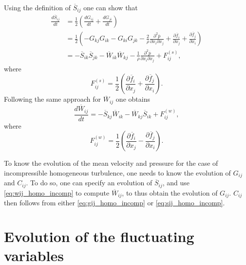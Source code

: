 \documentclass[oneside,a4paper,11pt]{report}
\newcommand{\favg}{\overline{f}}
\newcommand{\pavg}{\overline{p}}
\newcommand{\Savg}{\overline{S}}
\newcommand{\Wavg}{\overline{W}}
\begin{document}
Using the definition of $\Savg_{ij}$ one can show that
\begin{align}
\label{eq:sij_homo_incomp}
\frac{d \Savg_{ij}}{dt} &= \frac{1}{2} \left ( \frac{d G_{ij}}{dt} + \frac{d G_{ji}}{dt} \right ) \nonumber \\
& = \frac{1}{2} \left ( -G_{kj}G_{ik} - G_{ki}G_{jk} - \frac{2}{\rho} \frac{\partial^2 \pavg}{\partial x_i \partial x_j}  + \frac{\partial \favg_i }{\partial x_j} + \frac{ \partial \favg_j }{\partial x_i} \right ) \nonumber \\
& = -\Savg_{ik} \Savg_{jk} - \Wavg_{ik} \Wavg_{kj} - \frac{1}{\rho} \frac{\partial^2 \pavg}{\partial x_i \partial x_j} + F^{(s)}_{ij},
\end{align}
where
\begin{equation}
F^{(s)}_{ij} = \frac{1}{2} \left ( \frac{\partial \favg_i }{\partial x_j} + \frac{ \partial \favg_j }{\partial x_i} \right ).
\end{equation}
Following the same approach for $\Wavg_{ij}$ one obtains
\begin{equation}
\label{eq:wij_homo_incomp}
\frac{d \Wavg_{ij}}{dt} = -\Savg_{kj} \Wavg_{ik} - \Wavg_{kj} \Savg_{ik} + F^{(w)}_{ij},
\end{equation}
where
\begin{equation}
F^{(w)}_{ij} = \frac{1}{2} \left ( \frac{\partial \favg_i }{\partial x_j} - \frac{ \partial \favg_j }{\partial x_i} \right ).
\end{equation}

To know the evolution of the mean velocity and pressure for the case of incompressible homogeneous turbulence, one needs to know the evolution of $G_{ij}$ and $C_{ij}$. To do so, one can specify an evolution of $\Savg_{ij}$, and use \cref{eq:wij_homo_incomp} to compute $\Wavg_{ij}$, to thus obtain the evolution of $G_{ij}$. $C_{ij}$ then follows from either \cref{eq:gij_homo_incomp} or \cref{eq:sij_homo_incomp}.


\section{Evolution of the fluctuating variables}

\end{document}
